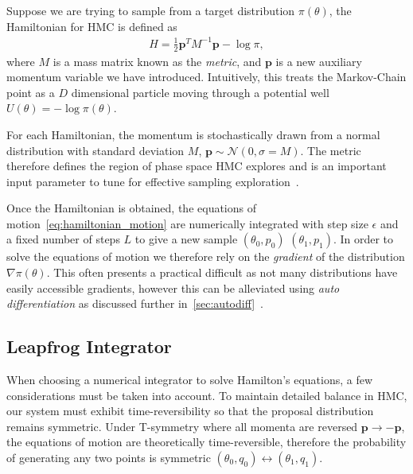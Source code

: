 \documentclass[11pt]{article}
\begin{document}
    Suppose we are trying to sample from a target distribution $\pi(\theta)$, the Hamiltonian for HMC is defined as
    \begin{equation}\label{eq:hmc_hamiltonian}
    \begin{aligned}
        H = \frac{1}{2} \mathbf{p}^T M^{-1} \mathbf{p} - \log \pi,
    \end{aligned}
    \end{equation}
    where $M$ is a mass matrix known as the \emph{metric}, and $\mathbf{p}$ is a new auxiliary momentum variable we have introduced.
    Intuitively, this treats the Markov-Chain point as a $D$ dimensional particle moving through a
    potential well $U(\theta) = -\log \pi(\theta)$.

    For each Hamiltonian, the momentum is stochastically drawn from a normal distribution with
    standard deviation $M$, $\mathbf{p} \sim \mathcal{N}(0, \sigma = M)$.
    The metric therefore defines the region of phase space HMC explores and is an important input parameter to
    tune for effective sampling exploration~\cite{betancourt2016energymetric}.

    Once the Hamiltonian is obtained, the equations of motion~\ref{eq:hamiltonian_motion} are numerically integrated
    with step size $\epsilon$ and a fixed number of steps $L$ to give a new
    sample $(\theta_0, p_0)$ \rightarrow $(\theta_1, p_1)$.
    In order to solve the equations of motion we therefore rely on the \emph{gradient} of the
    distribution $\nabla \pi(\theta)$.
    This often presents a practical difficult as not many distributions have easily accessible gradients, however this
    can be alleviated using \emph{auto differentiation} as discussed further in~\ref{sec:autodiff}~\cite{carpenter2015stan}.


\subsection{Leapfrog Integrator}\label{subsec:integrator}
    When choosing a numerical integrator to solve Hamilton's equations, a few considerations must be taken into account.
    To maintain detailed balance in HMC, our system must exhibit time-reversibility so that the proposal distribution
    remains symmetric.
    Under T-symmetry where all momenta are reversed $\mathbf{p} \rightarrow -\mathbf{p}$, the equations of motion are
    theoretically time-reversible, therefore the probability of generating any two points is
    symmetric $(\theta_0, q_0) \leftrightarrow (\theta_1, q_1)$.
\end{document}
